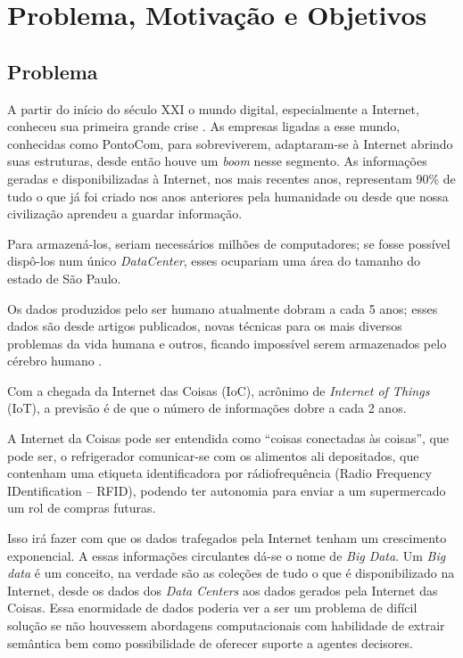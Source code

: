 \chapter{Problema, Motivação e Objetivos}\label{intro}

\section{ Problema}\label{intro:problem}

A partir do início do século XXI o mundo digital, especialmente a Internet, conheceu sua primeira grande crise \cite{Quadros2005}.
As empresas ligadas a esse mundo, conhecidas como PontoCom, para sobreviverem, adaptaram-se à Internet abrindo suas estruturas, desde então houve um \textit{boom} nesse 
segmento.
As informações geradas e disponibilizadas à Internet, nos mais recentes anos, representam 90\% de tudo o que já foi criado nos anos anteriores pela humanidade ou desde que 
nossa civilização aprendeu a guardar informação.

Para armazená-los, seriam necessários milhões de computadores; se fosse possível dispô-los num único \textit{DataCenter}, esses ocupariam 
uma área do tamanho do estado de São Paulo.

Os dados produzidos pelo ser humano atualmente dobram a cada 5 anos; esses dados são desde artigos publicados, novas técnicas para os mais diversos problemas da vida humana 
e outros, ficando impossível serem armazenados pelo cérebro humano \cite{bigdataMedicina}.

Com a chegada da Internet das Coisas (IoC), acrônimo de \textit{Internet of Things} (IoT), a previsão é de que o número de informações dobre a cada 2 anos.

A Internet da Coisas pode ser entendida como ``coisas conectadas às coisas'', que pode ser, o refrigerador comunicar-se com os alimentos ali depositados, que contenham uma 
etiqueta identificadora por rádiofrequência (Radio Frequency IDentification -- RFID), podendo ter autonomia para enviar a um supermercado um rol de compras futuras. 

Isso irá fazer com que os dados trafegados pela Internet tenham um crescimento exponencial. A essas informações circulantes dá-se o nome de \textit{Big Data}. 
Um \textit{Big data} é um conceito, na verdade são as coleções de tudo o que é disponibilizado na Internet, desde os dados dos \textit{Data Centers} aos dados gerados pela Internet das Coisas.
Essa enormidade de dados poderia ver a ser um problema de difícil solução se não houvessem abordagens computacionais com habilidade de 
extrair semântica bem como possibilidade de oferecer suporte a agentes decisores.

